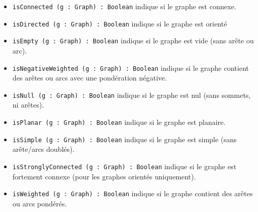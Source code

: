 \documentclass[french]{article}
\begin{document}
\begin{itemize}
			\item \texttt{isConnected (g : Graph) : Boolean} indique si le graphe est connexe.
			\item \texttt{isDirected (g : Graph) : Boolean} indique si le graphe est orienté
			\item \texttt{isEmpty (g : Graph) : Boolean} indique si le graphe est vide (sans arête ou arc).
			\item \texttt{isNegativeWeighted (g : Graph) : Boolean} indique si le graphe contient des arêtes ou arcs avec une pondération négative.
			\item \texttt{isNull (g : Graph) : Boolean} indique si le graphe est nul (sans sommets, ni arêtes).
			\item \texttt{isPlanar (g : Graph) : Boolean} indique si le graphe est planaire.
			\item \texttt{isSimple (g : Graph) : Boolean} indique si le graphe est simple (sans arête/arcs doublés).
			\item \texttt{isStronglyConnected (g : Graph) : Boolean} indique si le graphe est fortement connexe (pour les graphes orientés uniquement).
			\item \texttt{isWeighted (g : Graph) : Boolean} indique si le graphe contient des arêtes ou arcs pondérés.
			
		\end{itemize}
		
\end{document}
